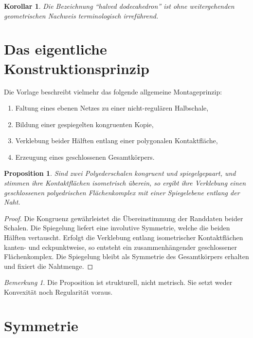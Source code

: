 \documentclass[11pt]{article}
\theoremstyle{plain}
\newtheorem{proposition}[satz]{Proposition}
\newtheorem{korollar}[satz]{Korollar}
\theoremstyle{definition}
\theoremstyle{remark}
\newtheorem{bemerkung}[satz]{Bemerkung}
\begin{document}
	\begin{korollar}
		Die Bezeichnung \enquote{halved dodecahedron} ist ohne weitergehenden geometrischen Nachweis terminologisch irreführend.
	\end{korollar}
	
	\section{Das eigentliche Konstruktionsprinzip}
	
	Die Vorlage beschreibt vielmehr das folgende allgemeine Montageprinzip:
	\begin{enumerate}[label=(\arabic*)]
		\item Faltung eines ebenen Netzes zu einer nicht-regulären Halbschale,
		\item Bildung einer gespiegelten kongruenten Kopie,
		\item Verklebung beider Hälften entlang einer polygonalen Kontaktfläche,
		\item Erzeugung eines geschlossenen Gesamtkörpers.
	\end{enumerate}
	
	\begin{proposition}\label{prop:verklebung-spiegel}
		Sind zwei Polyederschalen kongruent und spiegelgepaart, und stimmen ihre Kontaktflächen isometrisch überein, so ergibt ihre Verklebung einen geschlossenen polyedrischen Flächenkomplex mit einer Spiegelebene entlang der Naht.
	\end{proposition}
	
	\begin{proof}
		Die Kongruenz gewährleistet die Übereinstimmung der Randdaten beider Schalen. Die Spiegelung liefert eine involutive Symmetrie, welche die beiden Hälften vertauscht. Erfolgt die Verklebung entlang isometrischer Kontaktflächen kanten- und eckpunktweise, so entsteht ein zusammenhängender geschlossener Flächenkomplex. Die Spiegelung bleibt als Symmetrie des Gesamtkörpers erhalten und fixiert die Nahtmenge.
	\end{proof}
	
	\begin{bemerkung}
		Die Proposition ist strukturell, nicht metrisch. Sie setzt weder Konvexität noch Regularität voraus.
	\end{bemerkung}
	
	\section{Symmetrie}
	
\end{document}

